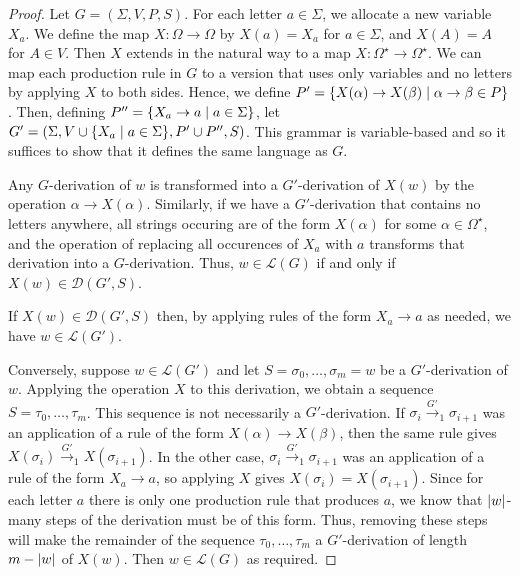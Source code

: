 \begin{proof}
	Let \( G = (\Sigma, V, P, S) \).
	For each letter \( a \in \Sigma \), we allocate a new variable \( X_a \).
	We define the map \( X \colon \Omega \to \Omega \) by \( X(a) = X_a \) for \( a \in \Sigma \), and \( X(A) = A \) for \( A \in V \).
	Then \( X \) extends in the natural way to a map \( X \colon \Omega^\star \to \Omega^\star \).
	We can map each production rule in \( G \) to a version that uses only variables and no letters by applying \( X \) to both sides.
	Hence, we define \( P' = \qty{X(\alpha) \to X(\beta) \mid \alpha \to \beta \in P} \).
	Then, defining \( P'' = \qty{X_a \to a \mid a \in \Sigma} \), let \( G' = (\Sigma, V \cup \qty{X_a \mid a \in \Sigma}, P' \cup P'', S) \).
	This grammar is variable-based and so it suffices to show that it defines the same language as \( G \).

	Any \( G \)-derivation of \( w \) is transformed into a \( G' \)-derivation of \( X(w) \) by the operation \( \alpha \to X(\alpha) \).
	Similarly, if we have a \( G' \)-derivation that contains no letters anywhere, all strings occuring are of the form \( X(\alpha) \) for some \( \alpha \in \Omega^\star \), and the operation of replacing all occurences of \( X_a \) with \( a \) transforms that derivation into a \( G \)-derivation.
	Thus, \( w \in \mathcal L(G) \) if and only if \( X(w) \in \mathcal D(G', S) \).

	If \( X(w) \in \mathcal D(G', S) \) then, by applying rules of the form \( X_a \to a \) as needed, we have \( w \in \mathcal L(G') \).

	Conversely, suppose \( w \in \mathcal L(G') \) and let \( S = \sigma_0, \dots, \sigma_m = w \) be a \( G' \)-derivation of \( w \).
	Applying the operation \( X \) to this derivation, we obtain a sequence \( S = \tau_0, \dots, \tau_m \).
	This sequence is not necessarily a \( G' \)-derivation.
	If \( \sigma_i \xrightarrow {G'}_1 \sigma_{i+1} \) was an application of a rule of the form \( X(\alpha) \to X(\beta) \), then the same rule gives \( X(\sigma_i) \xrightarrow {G'}_1 X(\sigma_{i+1}) \).
	In the other case, \( \sigma_i \xrightarrow {G'}_1 \sigma_{i+1} \) was an application of a rule of the form \( X_a \to a \), so applying \( X \) gives \( X(\sigma_i) = X(\sigma_{i+1}) \).
	Since for each letter \( a \) there is only one production rule that produces \( a \), we know that \( \abs{w} \)-many steps of the derivation must be of this form.
	Thus, removing these steps will make the remainder of the sequence \( \tau_0, \dots, \tau_m \) a \( G' \)-derivation of length \( m - \abs{w} \) of \( X(w) \).
	Then \( w \in \mathcal L(G) \) as required.
\end{proof}
